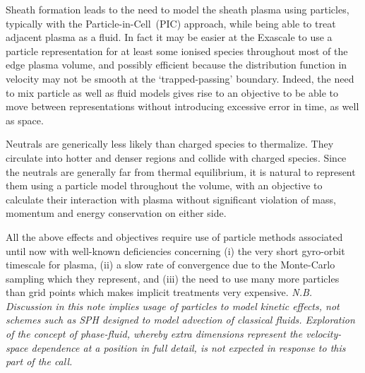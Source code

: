 Sheath formation leads to the need to model the sheath plasma using particles,
typically with the Particle-in-Cell~(PIC) approach, while being able to treat adjacent
plasma as a fluid.
In fact it may be easier at the Exascale to use a particle representation
for at least some ionised species throughout most of the edge plasma volume,
and possibly efficient because the distribution function in velocity may not be
smooth  at the `trapped-passing' boundary.
Indeed, the need to mix particle as well as fluid models
gives rise to an objective  to be able to move between representations without
introducing excessive error in time, as well as space.

Neutrals are generically less likely than charged species to thermalize.
They circulate into hotter and denser regions and collide with charged species.
Since the neutrals are generally far from thermal equilibrium, it is natural
to represent them using a particle model throughout the volume,
with an objective to calculate their interaction with plasma without
significant violation of mass, momentum and energy conservation on either side.

All the above effects and objectives require use of particle methods
associated until now with well-known deficiencies concerning (i) the very short
gyro-orbit timescale for plasma, (ii) a slow rate of convergence due to
the Monte-Carlo sampling which they represent, and (iii) the need to use
many more particles than grid points which makes implicit treatments
very expensive.
\emph{N.B. Discussion in this note implies usage of particles to model kinetic effects,
not schemes such as SPH designed to model advection of classical fluids.
Exploration of the concept of phase-fluid, whereby extra dimensions represent the velocity-space
dependence at a position in full detail, is not expected in response to this part of the call.}



